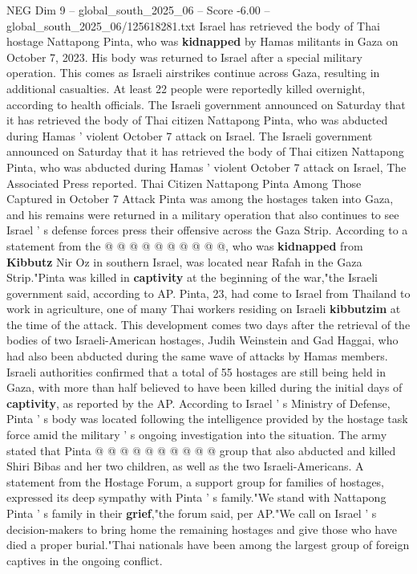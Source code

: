 \begin{textsample}{NEG Dim 9 – global\_south\_2025\_06 – Score -6.00 – global\_south\_2025\_06/125618281.txt}  \label{ex:f9_neg_251}
Israel has retrieved the body of Thai hostage Nattapong Pinta, who was \textbf{kidnapped} by Hamas militants in Gaza on October 7, 2023.
His body was returned to Israel after a special military operation.
This comes as Israeli airstrikes continue across Gaza, resulting in additional casualties.
At least 22 people were reportedly killed overnight, according to health officials.
The Israeli government announced on Saturday that it has retrieved the body of Thai citizen Nattapong Pinta, who was abducted during Hamas ' violent October 7 attack on Israel.
The Israeli government announced on Saturday that it has retrieved the body of Thai citizen Nattapong Pinta, who was abducted during Hamas ' violent October 7 attack on Israel, The Associated Press reported.
Thai Citizen Nattapong Pinta Among Those Captured in October 7 Attack Pinta was among the hostages taken into Gaza, and his remains were returned in a military operation that also continues to see Israel ' s defense forces press their offensive across the Gaza Strip.
According to a statement from the @ @ @ @ @ @ @ @ @ @, who was \textbf{kidnapped} from \textbf{Kibbutz} Nir Oz in southern Israel, was located near Rafah in the Gaza Strip."Pinta was killed in \textbf{captivity} at the beginning of the war,"the Israeli government said, according to AP.
Pinta, 23, had come to Israel from Thailand to work in agriculture, one of many Thai workers residing on Israeli \textbf{kibbutzim} at the time of the attack.
This development comes two days after the retrieval of the bodies of two Israeli-American hostages, Judih Weinstein and Gad Haggai, who had also been abducted during the same wave of attacks by Hamas members.
Israeli authorities confirmed that a total of 55 hostages are still being held in Gaza, with more than half believed to have been killed during the initial days of \textbf{captivity}, as reported by the AP.
According to Israel ' s Ministry of Defense, Pinta ' s body was located following the intelligence provided by the hostage task force amid the military ' s ongoing investigation into the situation.
The army stated that Pinta @ @ @ @ @ @ @ @ @ @ group that also abducted and killed Shiri Bibas and her two children, as well as the two Israeli-Americans.
A statement from the Hostage Forum, a support group for families of hostages, expressed its deep sympathy with Pinta ' s family."We stand with Nattapong Pinta ' s family in their \textbf{grief},"the forum said, per AP."We call on Israel ' s decision-makers to bring home the remaining hostages and give those who have died a proper burial."Thai nationals have been among the largest group of foreign captives in the ongoing conflict.

\end{textsample}
